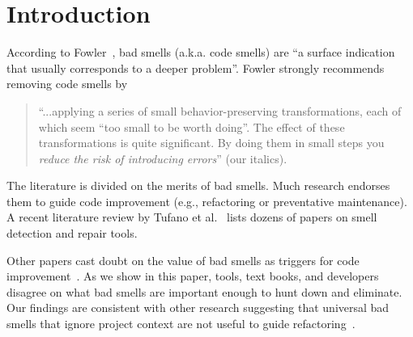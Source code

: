 \documentclass{sig-alternate}
\theoremstyle{break}
\begin{document}
\section{Introduction}





\noindent
According to   Fowler~\cite{fowler99}, bad smells (a.k.a. code smells)
are ``a surface indication that usually corresponds to a deeper problem''.
Fowler strongly recommends   removing   code smells   by
\begin{quote}
``...applying a series of small behavior-preserving transformations, each 
of which seem ``too small to be worth doing''. 
The  effect of   these transformations is quite significant. By doing them in small steps you {\em reduce the risk of introducing errors}'' (our italics).
\end{quote}
The literature is divided on the merits of bad smells.
Much research endorses them to guide
code improvement (e.g., refactoring or preventative maintenance). A recent literature review by Tufano et al.~\cite{Tufano2015}  
lists dozens of papers on smell detection and repair tools. 

Other papers cast doubt on the value of bad smells
as triggers for code improvement~\cite{Mantyla2004,Yamashita2013,Sjoberg2013}. 
As we show in this paper,  
 tools, text books, and developers disagree on what bad smells
are important enough to hunt down and eliminate. Our findings
are consistent with other research suggesting that universal bad
smells that ignore project context are not useful to guide refactoring~\cite{Mantyla2004,Yamashita2013,Sjoberg2013}.
 
\end{document}

